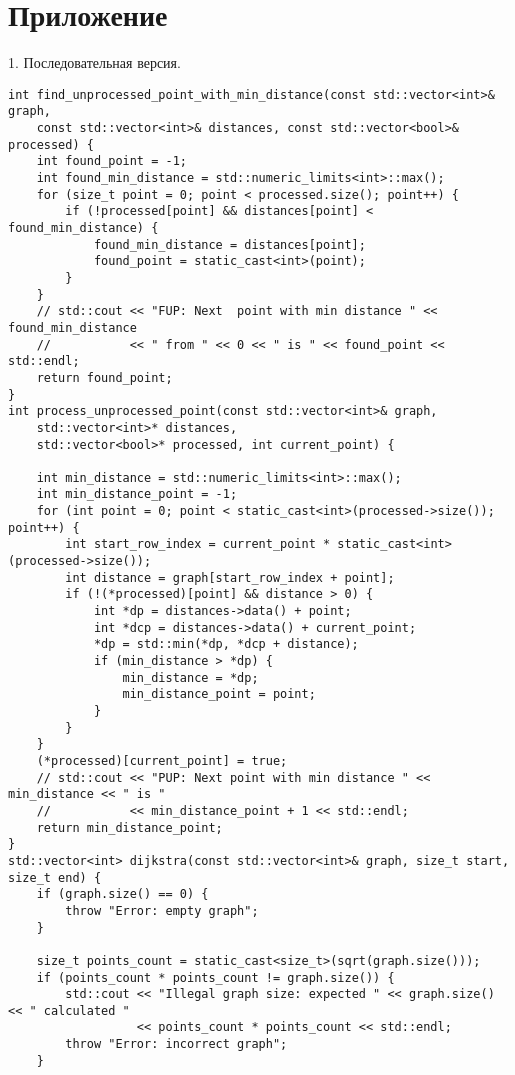 \documentclass{report}
\begin{document}
\section*{Приложение}
\par 1. Последовательная версия.
\begin{lstlisting}
int find_unprocessed_point_with_min_distance(const std::vector<int>& graph,
    const std::vector<int>& distances, const std::vector<bool>& processed) {
    int found_point = -1;
    int found_min_distance = std::numeric_limits<int>::max();
    for (size_t point = 0; point < processed.size(); point++) {
        if (!processed[point] && distances[point] < found_min_distance) {
            found_min_distance = distances[point];
            found_point = static_cast<int>(point);
        }
    }
    // std::cout << "FUP: Next  point with min distance " << found_min_distance
    //           << " from " << 0 << " is " << found_point << std::endl;
    return found_point;
}
int process_unprocessed_point(const std::vector<int>& graph,
    std::vector<int>* distances,
    std::vector<bool>* processed, int current_point) {

    int min_distance = std::numeric_limits<int>::max();
    int min_distance_point = -1;
    for (int point = 0; point < static_cast<int>(processed->size()); point++) {
        int start_row_index = current_point * static_cast<int>(processed->size());
        int distance = graph[start_row_index + point];
        if (!(*processed)[point] && distance > 0) {
            int *dp = distances->data() + point;
            int *dcp = distances->data() + current_point;
            *dp = std::min(*dp, *dcp + distance);
            if (min_distance > *dp) {
                min_distance = *dp;
                min_distance_point = point;
            }
        }
    }
    (*processed)[current_point] = true;
    // std::cout << "PUP: Next point with min distance " << min_distance << " is "
    //           << min_distance_point + 1 << std::endl;
    return min_distance_point;
}
std::vector<int> dijkstra(const std::vector<int>& graph, size_t start, size_t end) {
    if (graph.size() == 0) {
        throw "Error: empty graph";
    }

    size_t points_count = static_cast<size_t>(sqrt(graph.size()));
    if (points_count * points_count != graph.size()) {
        std::cout << "Illegal graph size: expected " << graph.size() << " calculated "
                  << points_count * points_count << std::endl;
        throw "Error: incorrect graph";
    }


\end{lstlisting}
\end{document}
